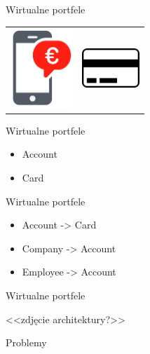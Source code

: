 \documentclass{beamer}
\begin{document}
\begin{frame}{Wirtualne portfele}
	\begin{center}
		\begin{tabular}{ c c }
  			\includegraphics[height=3cm]{wallet2.png} & \includegraphics[height=1.5cm]{prepaid1.png}
		\end{tabular}
	\end{center}
\end{frame}

\begin{frame}{Wirtualne portfele}
	\begin{huge}
		\begin{itemize}[<+->]
			\item Account
			\item Card
		\end{itemize}
	\end{huge}
\end{frame}

\begin{frame}{Wirtualne portfele}
	\begin{huge}
		\begin{itemize}[<+->]
			\item Account -> Card
			\item Company -> Account
			\item Employee -> Account
		\end{itemize}
	\end{huge}
\end{frame}

\begin{frame}{Wirtualne portfele}
	\begin{center}
		\Huge{<<zdjęcie architektury?>>}
	\end{center}
\end{frame}

\begin{frame}{}
	\begin{center}
		\Huge{Problemy}
	\end{center}
\end{frame}
\end{document}
